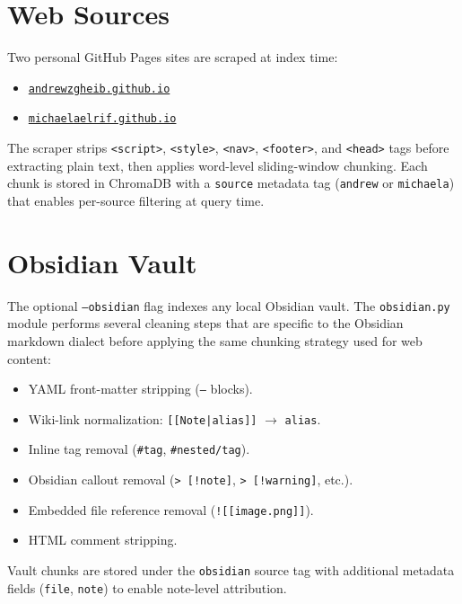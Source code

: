\documentclass[12pt, a4paper]{report}
\begin{document}
\section{Web Sources}

Two personal GitHub Pages sites are scraped at index time:

\begin{itemize}
      \item \href{https://andrewzgheib.github.io}{\texttt{andrewzgheib.github.io}}
      \item \href{https://michaelaelrif.github.io}{\texttt{michaelaelrif.github.io}}
\end{itemize}

The scraper strips \texttt{<script>}, \texttt{<style>}, \texttt{<nav>}, \texttt{<footer>}, and
\texttt{<head>} tags before extracting plain text, then applies word-level sliding-window
chunking. Each chunk is stored in ChromaDB with a \texttt{source} metadata tag
(\texttt{andrew} or \texttt{michaela}) that enables per-source filtering at query time.

\section{Obsidian Vault}

The optional \texttt{--obsidian} flag indexes any local Obsidian vault. The
\texttt{obsidian.py} module performs several cleaning steps that are specific to the Obsidian
markdown dialect before applying the same chunking strategy used for web content:

\begin{itemize}
      \item YAML front-matter stripping (\texttt{---} blocks).
      \item Wiki-link normalization: \texttt{[[Note|alias]]} $\to$ \texttt{alias}.
      \item Inline tag removal (\texttt{\#tag}, \texttt{\#nested/tag}).
      \item Obsidian callout removal (\texttt{> [!note]}, \texttt{> [!warning]}, etc.).
      \item Embedded file reference removal (\texttt{![[image.png]]}).
      \item HTML comment stripping.
\end{itemize}

Vault chunks are stored under the \texttt{obsidian} source tag with additional metadata
fields (\texttt{file}, \texttt{note}) to enable note-level attribution.
\end{document}
